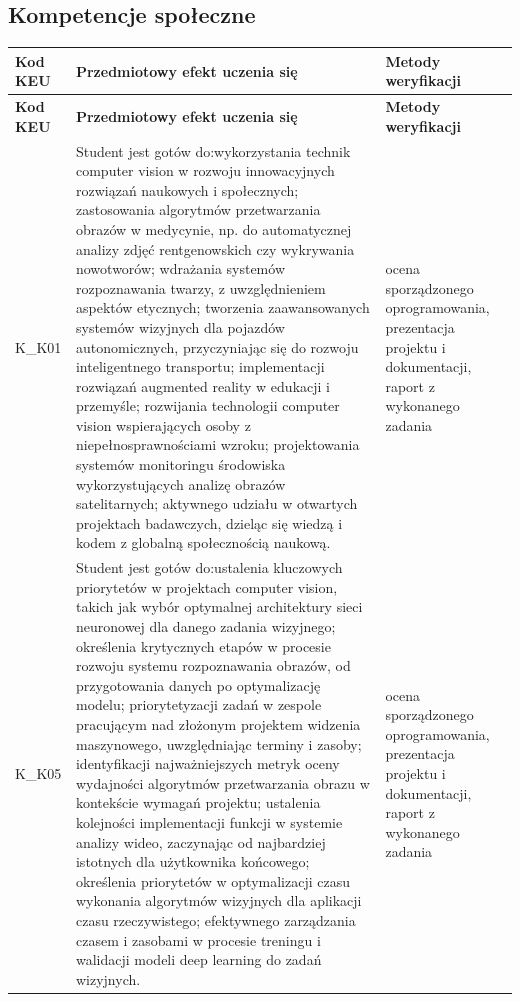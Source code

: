 \documentclass[12pt, a4paper]{article}
\newcommand{\thdrule}{\noalign{\global\setlength{\extrarowheight}{0pt}}}
\newcommand{\thdend}{\noalign{\global\setlength{\extrarowheight}{3pt}}}
\begin{document}
\subsection*{Kompetencje społeczne}
{\scriptsize
\begin{longtable}{m{1.6cm}m{9.0cm}m{4.2cm}}
\thdrule\toprule
\rowcolor{pjatkRed} {\color{white}\footnotesize\textbf{\vphantom{Ag}Kod KEU}} & {\color{white}\footnotesize\textbf{\vphantom{Ag}Przedmiotowy efekt uczenia się}} & {\color{white}\footnotesize\textbf{\vphantom{Ag}Metody weryfikacji}} \\
\midrule\thdend
\endfirsthead
\thdrule\toprule
\rowcolor{pjatkRed} {\color{white}\footnotesize\textbf{\vphantom{Ag}Kod KEU}} & {\color{white}\footnotesize\textbf{\vphantom{Ag}Przedmiotowy efekt uczenia się}} & {\color{white}\footnotesize\textbf{\vphantom{Ag}Metody weryfikacji}} \\
\midrule\thdend
\endhead
  \rowcolor{tableRowLight} K\_K01 & Student jest gotów do:wykorzystania technik computer vision w rozwoju innowacyjnych rozwiązań naukowych i społecznych; zastosowania algorytmów przetwarzania obrazów w medycynie, np. do automatycznej analizy zdjęć rentgenowskich czy wykrywania nowotworów; wdrażania systemów rozpoznawania twarzy, z uwzględnieniem aspektów etycznych; tworzenia zaawansowanych systemów wizyjnych dla pojazdów autonomicznych, przyczyniając się do rozwoju inteligentnego transportu; implementacji rozwiązań augmented reality w edukacji i przemyśle; rozwijania technologii computer vision wspierających osoby z niepełnosprawnościami wzroku; projektowania systemów monitoringu środowiska wykorzystujących analizę obrazów satelitarnych; aktywnego udziału w otwartych projektach badawczych, dzieląc się wiedzą i kodem z globalną społecznością naukową. & ocena sporządzonego oprogramowania, prezentacja projektu i dokumentacji, raport z wykonanego zadania \\
  \rowcolor{tableRowAlt} K\_K05 & Student jest gotów do:ustalenia kluczowych priorytetów w projektach computer vision, takich jak wybór optymalnej architektury sieci neuronowej dla danego zadania wizyjnego; określenia krytycznych etapów w procesie rozwoju systemu rozpoznawania obrazów, od przygotowania danych po optymalizację modelu; priorytetyzacji zadań w zespole pracującym nad złożonym projektem widzenia maszynowego, uwzględniając terminy i zasoby; identyfikacji najważniejszych metryk oceny wydajności algorytmów przetwarzania obrazu w kontekście wymagań projektu; ustalenia kolejności implementacji funkcji w systemie analizy wideo, zaczynając od najbardziej istotnych dla użytkownika końcowego; określenia priorytetów w optymalizacji czasu wykonania algorytmów wizyjnych dla aplikacji czasu rzeczywistego; efektywnego zarządzania czasem i zasobami w procesie treningu i walidacji modeli deep learning do zadań wizyjnych. & ocena sporządzonego oprogramowania, prezentacja projektu i dokumentacji, raport z wykonanego zadania \\
\bottomrule
\end{longtable}}
\end{document}
